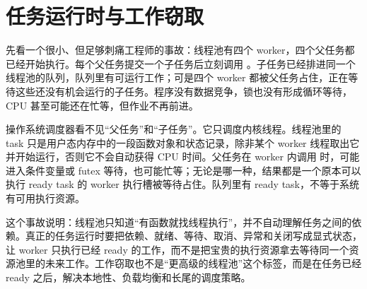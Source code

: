 \chapter{任务运行时与工作窃取}

先看一个很小、但足够刺痛工程师的事故：线程池有四个 worker，四个父任务都已经开始执行。每个父任务提交一个子任务后立刻调用 。子任务已经排进同一个线程池的队列，队列里有可运行工作；可是四个 worker 都被父任务占住，正在等待这些还没有机会运行的子任务。程序没有数据竞争，锁也没有形成循环等待，CPU 甚至可能还在忙等，但作业不再前进。

操作系统调度器看不见“父任务”和“子任务”。它只调度内核线程。线程池里的 task 只是用户态内存中的一段函数对象和状态记录，除非某个 worker 线程取出它并开始运行，否则它不会自动获得 CPU 时间。父任务在 worker 内调用  时，可能进入条件变量或 futex 等待，也可能忙等；无论是哪一种，结果都是一个原本可以执行 ready task 的 worker 执行槽被等待占住。队列里有 ready task，不等于系统有可用执行资源。

这个事故说明：线程池只知道“有函数就找线程执行”，并不自动理解任务之间的依赖。真正的任务运行时要把依赖、就绪、等待、取消、异常和关闭写成显式状态，让 worker 只执行已经 ready 的工作，而不是把宝贵的执行资源拿去等待同一个资源池里的未来工作。工作窃取也不是“更高级的线程池”这个标签，而是在任务已经 ready 之后，解决本地性、负载均衡和长尾的调度策略。

